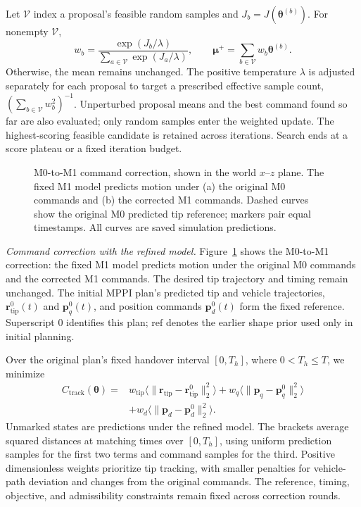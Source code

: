 \documentclass[letterpaper, 10 pt, conference]{ieeeconf}
\begin{document}
Let $\mathcal V$ index a proposal's feasible random samples and
$J_b=J(\boldsymbol\theta^{(b)})$. For nonempty $\mathcal V$,
\begin{equation}
w_b=\frac{\exp(J_b/\lambda)}{\sum_{a\in\mathcal V}\exp(J_a/\lambda)},
\qquad
\boldsymbol\mu^+=\sum_{b\in\mathcal V}w_b\boldsymbol\theta^{(b)}.
\label{eq:offline_sampling_update}
\end{equation}
Otherwise, the mean remains unchanged. The positive temperature
$\lambda$ is adjusted separately for each proposal to target a
prescribed effective sample count,
$(\sum_{b\in\mathcal V}w_b^2)^{-1}$.
Unperturbed proposal means and the best command found so far
are also evaluated; only random samples enter the weighted update.
The highest-scoring feasible candidate is retained across iterations.
Search ends at a score plateau or a fixed iteration budget.

\begin{figure}[t]
    \centering
    \resizebox{\columnwidth}{!}{}
    \caption{M0-to-M1 command correction, shown in the world $x$--$z$
    plane. The fixed M1 model predicts motion under (a) the original
    M0 commands and (b) the corrected M1 commands. Dashed curves show
    the original M0 predicted tip reference; markers pair equal
    timestamps. All curves are saved simulation predictions.}
    \label{fig:command_correction}
\end{figure}

\noindent\emph{Command correction with the refined model.}
Figure~\ref{fig:command_correction} shows the M0-to-M1 correction:
the fixed M1 model predicts motion under the original M0 commands
and the corrected M1 commands.
The desired tip trajectory and timing remain unchanged. The initial MPPI
plan's predicted tip and vehicle trajectories,
$\mathbf r_{\mathrm{tip}}^0(t)$ and $\mathbf p_q^0(t)$,
and position commands $\mathbf p_d^0(t)$ form the fixed reference.
Superscript $0$ identifies this plan; $\mathrm{ref}$ denotes
the earlier shape prior used only in initial planning.

Over the original plan's fixed handover interval $[0,T_h]$,
where $0<T_h\leq T$, we minimize
\begin{equation}
\begin{aligned}
C_{\mathrm{track}}(\boldsymbol\theta)
={}&w_{\mathrm{tip}}\bigl\langle\|\mathbf r_{\mathrm{tip}}-\mathbf r_{\mathrm{tip}}^0\|_2^2\bigr\rangle
+w_q\bigl\langle\|\mathbf p_q-\mathbf p_q^0\|_2^2\bigr\rangle\\
&+w_d\bigl\langle\|\mathbf p_d-\mathbf p_d^0\|_2^2\bigr\rangle.
\end{aligned}
\label{eq:reference_tracking_cost}
\end{equation}
Unmarked states are predictions under the refined model.
The brackets average squared distances at matching times over
$[0,T_h]$, using uniform prediction samples for the first two
terms and command samples for the third. Positive dimensionless
weights prioritize tip tracking, with smaller penalties for
vehicle-path deviation and changes from the original commands.
The reference, timing, objective, and admissibility constraints
remain fixed across correction rounds.
\end{document}
